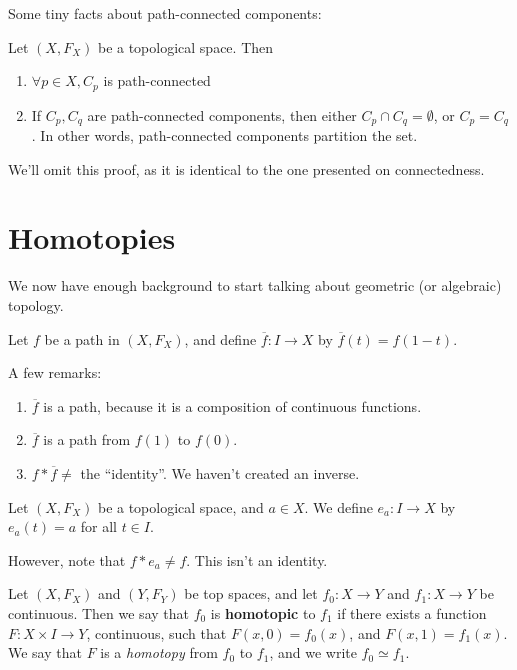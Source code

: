 Some tiny facts about path-connected components:

Let $(X,F_X)$ be a topological space. Then
\begin{enumerate}
	\item $\forall p\in X, C_p$ is path-connected
	\item If $C_p, C_q$ are path-connected components, then either $C_p \cap C_q = \emptyset$, or $C_p = C_q$. In other words, path-connected components partition the set. 
\end{enumerate}
We'll omit this proof, as it is identical to the one presented on connectedness.
\section{Homotopies}
We now have enough background to start talking about geometric (or algebraic) topology.

\begin{definition}
Let $f$ be a path in $(X,F_X)$, and define $\overline{f} : I \to X$ by $\overline{f} (t) = f(1-t)$. 
\end{definition}

A few remarks:
\begin{enumerate}
	\item $\overline{f}$ is a path, because it is a composition of continuous functions.
	\item $\overline{f}$ is a path from $f(1)$ to $f(0)$.
	\item $f \ast \overline{f} \neq $ the ``identity''. We haven't created an inverse. 
\end{enumerate}

\begin{definition}
Let $(X,F_X)$ be a topological space, and $a\in X$. We define $e_a: I\to X$ by $e_a (t) = a$ for all $t\in I$.
\end{definition}

However, note that  $f\ast e_a \neq f$. This isn't  an identity.

\begin{definition}
Let $(X,F_X)$ and $(Y,F_Y)$ be top spaces, and let $f_0: X \to Y$ and $f_1:X\to Y$ be continuous. Then we say that $f_0$ is \textbf{homotopic} to $f_1$ if there exists a function $F:X\times I \to Y$, continuous, such that $F(x,0)  = f_0 (x)$, and $F(x,1) = f_1(x)$. We say that $F$ is a \textit{homotopy} from $f_0$ to $f_1$, and we write $f_0 \simeq f_1$. 
\end{definition}

